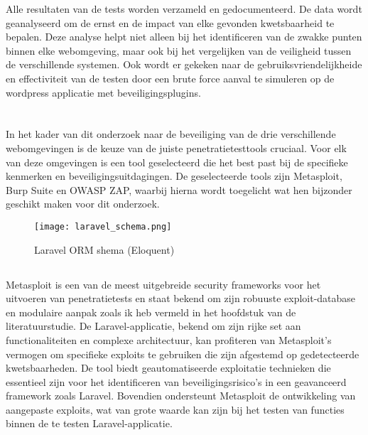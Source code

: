 Alle resultaten van de tests worden verzameld en gedocumenteerd. De data wordt geanalyseerd 
om de ernst en de impact van elke gevonden kwetsbaarheid te bepalen. Deze analyse helpt niet alleen bij 
het identificeren van de zwakke punten binnen elke webomgeving, maar ook bij het vergelijken van de 
veiligheid tussen de verschillende systemen. Ook wordt er gekeken naar de gebruiksvriendelijkheide en 
effectiviteit van de testen door een brute force aanval te simuleren op de wordpress applicatie met beveiligingsplugins.

\section{}
In het kader van dit onderzoek naar de beveiliging van de drie verschillende webomgevingen is de keuze van 
de juiste penetratietesttools cruciaal. Voor elk van deze omgevingen is een tool geselecteerd die het 
best past bij de specifieke kenmerken en beveiligingsuitdagingen. De geselecteerde tools zijn 
Metasploit, Burp Suite en OWASP ZAP, waarbij hierna wordt toegelicht wat hen bijzonder geschikt maken voor dit onderzoek.
\begin{figure}
    \centering
    \texttt{[image: laravel\_schema.png]}
    \caption[Laravel ORM schema (Eloquent)]{Laravel ORM shema (Eloquent)}
\end{figure}
\subsection{}
Metasploit is een van de meest uitgebreide security frameworks voor het uitvoeren van penetratietests en 
staat bekend om zijn robuuste exploit-database en modulaire aanpak zoals ik heb vermeld in het hoofdstuk 
 van de literatuurstudie. De Laravel-applicatie, bekend 
om zijn rijke set aan functionaliteiten en complexe architectuur, kan profiteren van Metasploit's 
vermogen om specifieke exploits te gebruiken die zijn afgestemd op gedetecteerde kwetsbaarheden. 
De tool biedt geautomatiseerde exploitatie technieken die essentieel zijn voor het identificeren 
van beveiligingsrisico's in een geavanceerd framework zoals Laravel. Bovendien ondersteunt 
Metasploit de ontwikkeling van aangepaste exploits, wat van grote waarde kan zijn bij 
het testen van functies binnen de te testen Laravel-applicatie.

